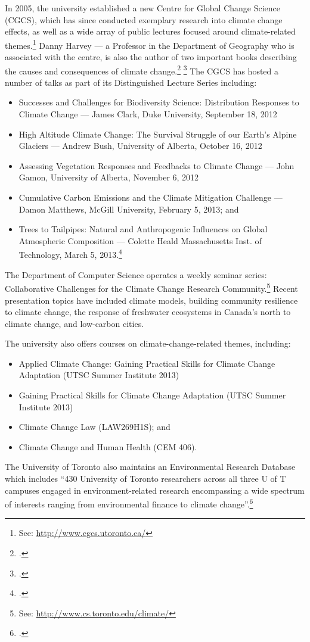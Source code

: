 In 2005, the university established a new Centre for Global Change Science (CGCS), which has since conducted exemplary research into climate change effects, as well as a wide array of public lectures focused around climate-related themes.\footnote{See: \url{http://www.cgcs.utoronto.ca/}}
Danny Harvey --- a Professor in the Department of Geography who is associated with the centre, is also the author of two important books describing the causes and consequences of climate change.\footcite[][]{Harvey1999a} \footcite[][]{Harvey1999b}
The CGCS has hosted a number of talks as part of its Distinguished Lecture Series including:
\begin{itemize}
	\item Successes and Challenges for Biodiversity Science: Distribution Responses to Climate Change --- James Clark, Duke University, September 18, 2012
	\item High Altitude Climate Change: The Survival Struggle of our Earth’s Alpine Glaciers --- Andrew Bush, University of Alberta, October 16, 2012 
	\item Assessing Vegetation Responses and Feedbacks to Climate Change --- John Gamon, University of Alberta, November 6, 2012
	\item Cumulative Carbon Emissions and the Climate Mitigation Challenge --- Damon Matthews, McGill University, February 5, 2013; and
	\item Trees to Tailpipes: Natural and Anthropogenic Influences on Global Atmospheric Composition --- Colette Heald Massachusetts Inst. of Technology, March 5, 2013.\footcite[][]{DistinguishedLecturer}
\end{itemize}



The Department of Computer Science operates a weekly seminar series: Collaborative Challenges for the Climate Change Research Community.\footnote{See: \url{http://www.cs.toronto.edu/climate/}}
Recent presentation topics have included climate models, building community resilience to climate change, the response of freshwater ecosystems in Canada's north to climate change, and low-carbon cities.



The university also offers courses on climate-change-related themes, including:
\begin{itemize}
	\item Applied Climate Change: Gaining Practical Skills for Climate Change Adaptation (UTSC Summer Institute 2013)
	\item Gaining Practical Skills for Climate Change Adaptation (UTSC Summer Institute 2013)
	\item Climate Change Law (LAW269H1S); and
	\item Climate Change and Human Health (CEM 406).
\end{itemize}
The University of Toronto also maintains an Environmental Research Database which includes ``430 University of Toronto researchers across all three U of T campuses engaged in environment-related research encompassing a wide spectrum of interests ranging from environmental finance to climate change''.\footcite[][]{UTEnvResDB}



